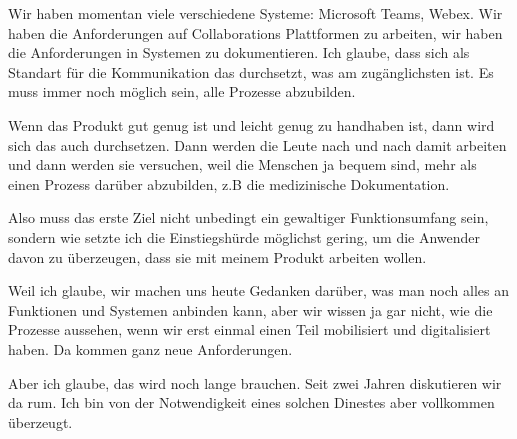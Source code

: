 Wir haben momentan viele verschiedene Systeme: Microsoft Teams, Webex. Wir haben die Anforderungen auf Collaborations Plattformen zu arbeiten, wir haben die Anforderungen in Systemen zu dokumentieren. Ich glaube, dass sich als Standart für die Kommunikation das durchsetzt, was am zugänglichsten ist. Es muss immer noch möglich sein, alle Prozesse abzubilden.

Wenn das Produkt gut genug ist und leicht genug zu handhaben ist, dann wird sich das auch durchsetzen. Dann werden die Leute nach und nach damit arbeiten und dann werden sie versuchen, weil die Menschen ja bequem sind, mehr als einen Prozess darüber abzubilden, z.B die medizinische Dokumentation.

Also muss das erste Ziel nicht unbedingt ein gewaltiger Funktionsumfang sein, sondern wie setzte ich  die Einstiegshürde möglichst gering, um die Anwender davon zu überzeugen, dass sie mit meinem Produkt arbeiten wollen.

Weil ich glaube, wir machen uns heute Gedanken darüber, was man noch alles an Funktionen und Systemen anbinden kann, aber wir wissen ja gar nicht, wie die Prozesse aussehen, wenn wir erst einmal einen Teil mobilisiert und digitalisiert haben. Da kommen ganz neue Anforderungen. 

Aber ich glaube, das wird noch lange brauchen. Seit zwei Jahren diskutieren wir da rum. Ich bin von der Notwendigkeit eines solchen Dinestes aber vollkommen überzeugt.